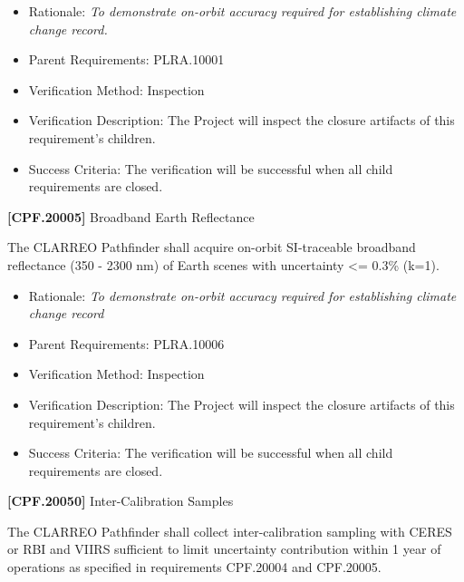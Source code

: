 \documentclass[12pt,oneside,oldfontcommands]{memoir}
\begin{document}
\begin{itemize}
\item{} Rationale: \emph{To demonstrate on-orbit accuracy required for establishing climate change record.}

\item{} Parent Requirements: PLRA.10001

\item{} Verification Method: Inspection

\item{} Verification Description: The Project will inspect the closure artifacts of this requirement's children.

\item{} Success Criteria: The verification will be successful when all child requirements are closed.

\end{itemize}

\textbf{[CPF.20005]} Broadband Earth Reflectance

The \gls{CLARREO} Pathfinder shall acquire on-orbit \gls{SI}-traceable broadband reflectance (350 - 2300 nm) of Earth scenes with uncertainty <= 0.3\% (k=1).

\begin{itemize}
\item{} Rationale: \emph{To demonstrate on-orbit accuracy required for establishing climate change record}

\item{} Parent Requirements: PLRA.10006

\item{} Verification Method: Inspection

\item{} Verification Description: The Project will inspect the closure artifacts of this requirement's children.

\item{} Success Criteria: The verification will be successful when all child requirements are closed.

\end{itemize}

\textbf{[CPF.20050]} Inter-Calibration Samples

The \gls{CLARREO} Pathfinder shall \gls{collect} inter-calibration sampling with \gls{CERES} or \gls{RBI} and \gls{VIIRS} sufficient to limit uncertainty contribution within 1 year of operations as specified in requirements \gls{CPF}.20004 and \gls{CPF}.20005.
\end{document}
